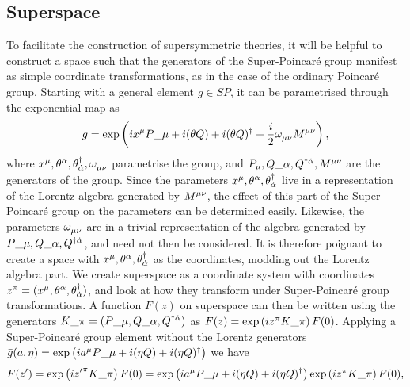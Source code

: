 \documentclass[../main.tex]{subfiles}
\begin{document}
        \subsection{Superspace}
            To facilitate the construction of supersymmetric theories, it will be helpful to construct a space such that the generators of the Super-Poincaré group manifest as simple coordinate transformations, as in the case of the ordinary Poincaré group.
            Starting with a general element \(g \in SP\), it can be parametrised through the exponential map as
            \begin{equation}
                g = \exptext{ix\^{\mu} P\_{\mu} + i(\theta Q) + i (\theta Q)^\dagger + \frac{i}{2}\tensor{\omega}{_\mu_\nu}\tensor{M}{^\mu^\nu}},
            \end{equation}
            where \(x^\mu, \theta\^{\alpha}, \theta\indices*{^\dagger_{\dot\alpha}}, \tensor{\omega}{_\mu_\nu}\) parametrise the group, and \(P_\mu, Q\_{\alpha}, Q\indices*{^\dagger^{\dot\alpha}}, \tensor{M}{^\mu^\nu}\) are the generators of the group.
            Since the parameters \(x\^{\mu}, \theta\^{\alpha}, \theta\indices*{^\dagger_{\dot\alpha}}\) live in a representation of the Lorentz algebra generated by \(\tensor{M}{^\mu^\nu}\), the effect of this part of the Super-Poincaré group on the parameters can be determined easily.
            Likewise, the parameters \(\tensor{\omega}{_\mu_\nu}\) are in a trivial representation of the algebra generated by \(P\_{\mu}, Q\_{\alpha}, Q\indices*{^\dagger^{\dot\alpha}}\), and need not then be considered.
            It is therefore poignant to create a space with \(x\^{\mu}, \theta\^{\alpha}, \theta\indices*{^\dagger_{\dot\alpha}}\) as the coordinates, modding out the Lorentz algebra part.
            We create superspace as a coordinate system with coordinates \(z\^{\pi} = (x\^{\mu}, \theta\^{\alpha}, \theta\indices*{^\dagger_{\dot\alpha}})\), and look at how they transform under Super-Poincaré group transformations.
            A function \(F(z)\) on superspace can then be written using the generators \(K\_\pi = (P\_\mu, Q\_\alpha, Q\indices*{^\dagger^{\dot\alpha}})\) as \(F(z) = \exptext{iz\^\pi K\_\pi} F(0)\).
            Applying a Super-Poincaré group element without the Lorentz generators \(\bar{g}(a, \eta) = \exptext{ia\^\mu P\_\mu + i (\eta Q) + i (\eta Q)^\dagger}\) we have
            \begin{equation}
                F(z^\prime) = \exptext{i{z^\prime}\^\pi K\_\pi} F(0) = \exptext{ia\^\mu P\_\mu + i (\eta Q) + i (\eta Q)^\dagger} \exptext{iz\^\pi K\_\pi} F(0),
            \end{equation}
\end{document}
